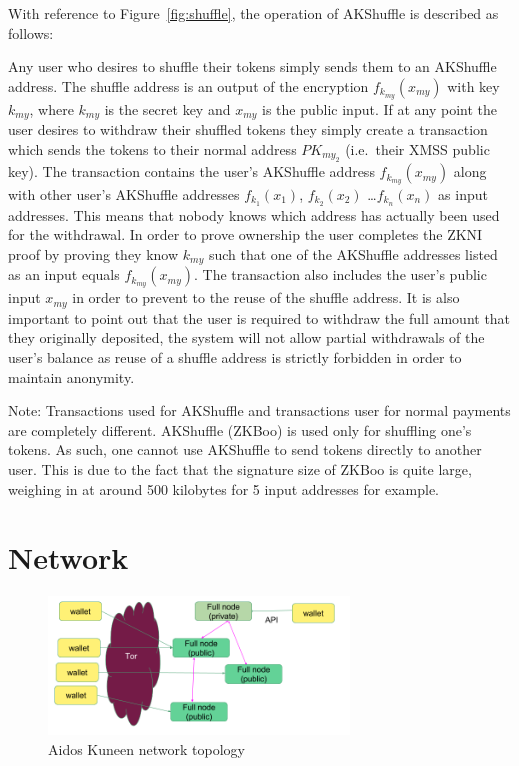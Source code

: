 \documentclass[a4paper,10pt,twocolumn]{article}
\begin{document}
With reference to Figure~\ref{fig:shuffle}, the operation of AKShuffle is described as follows:

Any user who desires to shuffle their tokens simply sends them to an AKShuffle address.
The shuffle address is an output of the encryption \( f_{k_{my}}(x_{my}) \) with key \( k_{my} \),  
where \(k_{my}\) is the secret key  and \(x_{my}\) is the public input.
If at any point the user desires to withdraw their shuffled tokens they simply create a transaction which sends the tokens to their 
normal address \(PK_{my_2}\) (i.e.\ their XMSS public key).
The transaction contains the user's AKShuffle address \( f_{k_{my}}(x_{my}) \) along with other user's AKShuffle addresses 
\( f_{k_{1}}(x_{1}) \), \( f_{k_{2}}(x_{2}) \) \dots \( f_{k_{n}}(x_{n}) \) as input addresses. 
This means that nobody knows which address has actually been used for the withdrawal. 
In order to prove ownership the user completes the ZKNI proof by proving they know \( k_{my} \) such that one of the AKShuffle 
addresses listed as an input equals \( f_{k_{my}}(x_{my}) \). 
The transaction also includes the user's public input \( x_{my} \) in order to prevent to the reuse of the shuffle address. It is also 
important to point out that the user is required to withdraw the full amount that they originally deposited, 
the system will not allow partial withdrawals of the user's balance as reuse of a shuffle address is strictly forbidden in order to maintain anonymity.

Note: Transactions used for AKShuffle and transactions user for normal payments are completely different. AKShuffle (ZKBoo) is used 
only for shuffling one's tokens. As such, one cannot use AKShuffle to send tokens directly to another user. This is due to the fact 
that the signature size of ZKBoo is quite large, weighing in at around 500 kilobytes for 5 input addresses for example.

\section{Network}
\label{sec:network}

\begin{figure}[ht]
	\begin{center}
	\includegraphics[width=80mm]{network.png}
	  \caption{Aidos Kuneen network topology}
    \label{fig:network}
	\end{center}
 \end{figure}
\end{document}
